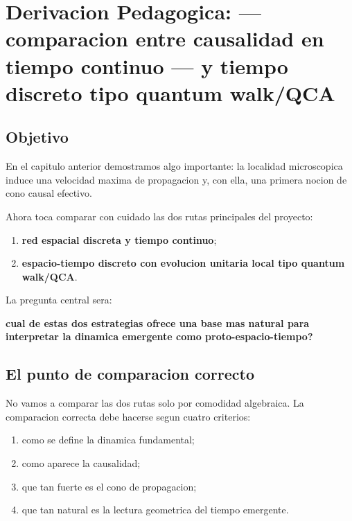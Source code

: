 \chapter{Derivacion Pedagogica: --- comparacion entre causalidad en tiempo continuo --- y tiempo discreto tipo quantum walk/QCA}
\label{ch:causalidad-continuo-vs-discreto}







\section{Objetivo}
En el capitulo anterior demostramos algo importante: la localidad microscopica induce una velocidad maxima de propagacion y, con ella, una primera nocion de cono causal efectivo.

Ahora toca comparar con cuidado las dos rutas principales del proyecto:
\begin{enumerate}[label=\arabic*.]
    \item \textbf{red espacial discreta y tiempo continuo};
    \item \textbf{espacio-tiempo discreto con evolucion unitaria local tipo quantum walk/QCA}.
\end{enumerate}

La pregunta central sera:
\begin{displayquote}
\textbf{cual de estas dos estrategias ofrece una base mas natural para interpretar la dinamica emergente como proto-espacio-tiempo?}
\end{displayquote}

\section{El punto de comparacion correcto}
No vamos a comparar las dos rutas solo por comodidad algebraica. La comparacion correcta debe hacerse segun cuatro criterios:
\begin{enumerate}[label=\arabic*.]
    \item como se define la dinamica fundamental;
    \item como aparece la causalidad;
    \item que tan fuerte es el cono de propagacion;
    \item que tan natural es la lectura geometrica del tiempo emergente.
\end{enumerate}

